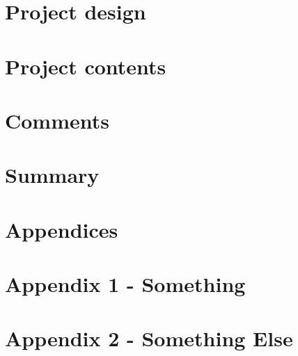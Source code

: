 \documentclass[12pt, a4paper]{report}
\begin{document}
    \chapter{Project design}\label{ch:project-design}
    

    \chapter{Project contents}\label{ch:project-contents}
    

    \chapter{Comments}\label{ch:comments}
    

    \chapter{Summary}\label{ch:summary}
    

    \pagebreak
    \printbibliography

    \pagebreak
    \appendix
    \chapter*{Appendices}
    \renewcommand{\thechapter}{\arabic{chapter}}

    \label{chapter:appendix-one}
    {\let\clearpage\relax\chapter*{Appendix 1 - Something}}
    

    \clearpage
    \label{chapter:appendix-something-else}
    \chapter*{Appendix 2 - Something Else}
    
\end{document}
